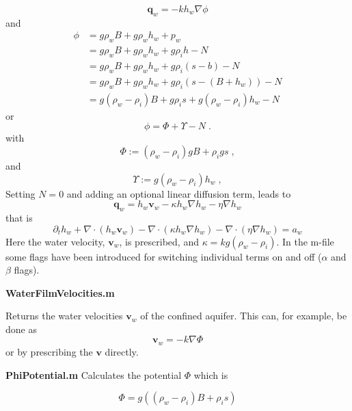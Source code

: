 \documentclass[10pt,a4paper]{article}
\begin{document}
\begin{equation}
\bm{q}_w=  - k h_w \nabla \phi
\label{eq:Df}
\end{equation}
and
\begin{align}
  \phi & = g \rho_w B + g \rho_w h_w + p_w  \label{eq:phi1} \\
  & = g \rho_w B + g \rho_w h_w + g \rho_i h - N \nonumber \\
    & = g \rho_w B + g \rho_w h_w + g \rho_i (s-b) - N \nonumber \\
  & = g \rho_w B + g \rho_w h_w + g \rho_i (s-(B+h_w))  - N \nonumber \\
  & = g (\rho_w-\rho_i) B + g \rho_i s +  g (\rho_w-\rho_i)  h_w  - N \label{eq:phi2}
\end{align}
or
\begin{equation}
\phi= \Phi +  \Upsilon - N\; .
 \label{eq:hwEq}
\end{equation}
with
\begin{equation}
  \Phi := (\rho_w - \rho_i) g B  +  \rho_i g s \; ,
 \label{eq:Phidef2}
\end{equation}
and
\begin{equation}
  \Upsilon := g (\rho_w-\rho_i)  h_w  \; ,
 \label{eq:Phidef3}
\end{equation}
Setting $N=0$ and adding an optional linear diffusion term, leads to
\[
\bm{q}_w =   h_w \bm{v}_w   -   \kappa h_w \nabla h_w   -   \eta  \nabla h_w \]
that is
\[
\partial_t h_w +  \nabla \cdot (  h_w \bm{v}_w )  - \nabla \cdot (\kappa h_w \nabla h_w) -\nabla \cdot (\eta \nabla h_w )= a_w
\]
Here the water velocity, $\bm{v}_w$, is prescribed, and $\kappa=k g
(\rho_w-\rho_i)$. In the m-file some flags have been introduced for switching individual terms on and off ($\alpha$ and $\beta$ flags).
 
\medskip
\textbf{WaterFilmVelocities.m}

Returns the water velocities $\bm{v}_w$ of the confined aquifer. This can, for example, be done as
\[ \bm{v}_w= - k \nabla \Phi \]
or by prescribing the $\bm{v}$ directly.

\medskip
\textbf{PhiPotential.m}
Calculates the potential $\Phi$ which is

\[
\Phi = g \left ( (\rho_w-\rho_i) B + \rho_i  s \right )   \]

\medskip




\clearpage





%
%
%
\end{document}
